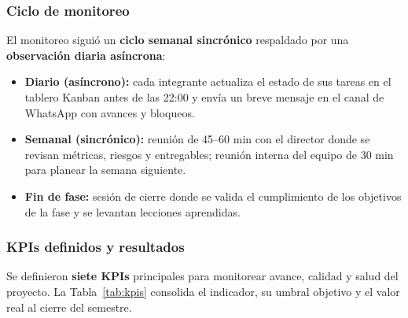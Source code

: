 \documentclass[12pt,oneside]{report}
\begin{document}
      \subsubsection{Ciclo de monitoreo}
      El monitoreo siguió un \textbf{ciclo semanal sincrónico} respaldado por una \textbf{observación diaria asíncrona}:
      \begin{itemize}
        \item \textbf{Diario (asíncrono):} cada integrante actualiza el estado de sus tareas en el tablero Kanban antes de las 22:00 y envía un breve mensaje en el canal de WhatsApp con avances y bloqueos.
        \item \textbf{Semanal (sincrónico):} reunión de 45--60 min con el director donde se revisan métricas, riesgos y entregables; reunión interna del equipo de 30 min para planear la semana siguiente.
        \item \textbf{Fin de fase:} sesión de cierre donde se valida el cumplimiento de los objetivos de la fase y se levantan lecciones aprendidas.
      \end{itemize}

      \subsubsection{KPIs definidos y resultados}
      Se definieron \textbf{siete KPIs} principales para monitorear avance, calidad y salud del proyecto. La Tabla~\ref{tab:kpis} consolida el indicador, su umbral objetivo y el valor real al cierre del semestre.
\end{document}
